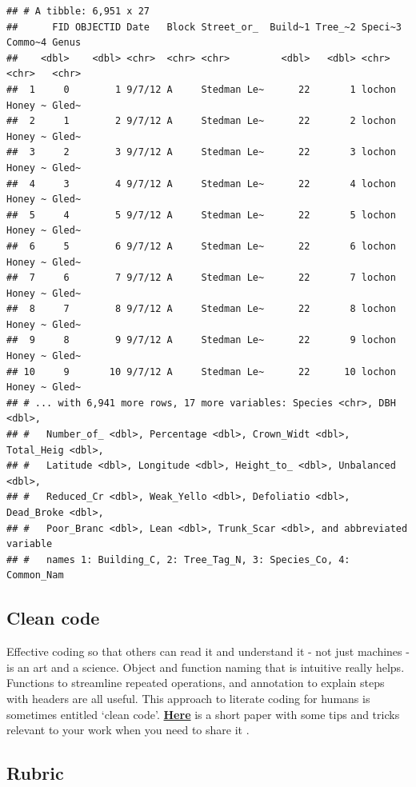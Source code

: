 \documentclass[
]{book}
\begin{document}
\begin{verbatim}
## # A tibble: 6,951 x 27
##      FID OBJECTID Date   Block Street_or_  Build~1 Tree_~2 Speci~3 Commo~4 Genus
##    <dbl>    <dbl> <chr>  <chr> <chr>         <dbl>   <dbl> <chr>   <chr>   <chr>
##  1     0        1 9/7/12 A     Stedman Le~      22       1 lochon  Honey ~ Gled~
##  2     1        2 9/7/12 A     Stedman Le~      22       2 lochon  Honey ~ Gled~
##  3     2        3 9/7/12 A     Stedman Le~      22       3 lochon  Honey ~ Gled~
##  4     3        4 9/7/12 A     Stedman Le~      22       4 lochon  Honey ~ Gled~
##  5     4        5 9/7/12 A     Stedman Le~      22       5 lochon  Honey ~ Gled~
##  6     5        6 9/7/12 A     Stedman Le~      22       6 lochon  Honey ~ Gled~
##  7     6        7 9/7/12 A     Stedman Le~      22       7 lochon  Honey ~ Gled~
##  8     7        8 9/7/12 A     Stedman Le~      22       8 lochon  Honey ~ Gled~
##  9     8        9 9/7/12 A     Stedman Le~      22       9 lochon  Honey ~ Gled~
## 10     9       10 9/7/12 A     Stedman Le~      22      10 lochon  Honey ~ Gled~
## # ... with 6,941 more rows, 17 more variables: Species <chr>, DBH <dbl>,
## #   Number_of_ <dbl>, Percentage <dbl>, Crown_Widt <dbl>, Total_Heig <dbl>,
## #   Latitude <dbl>, Longitude <dbl>, Height_to_ <dbl>, Unbalanced <dbl>,
## #   Reduced_Cr <dbl>, Weak_Yello <dbl>, Defoliatio <dbl>, Dead_Broke <dbl>,
## #   Poor_Branc <dbl>, Lean <dbl>, Trunk_Scar <dbl>, and abbreviated variable
## #   names 1: Building_C, 2: Tree_Tag_N, 3: Species_Co, 4: Common_Nam
\end{verbatim}

\hypertarget{clean-code}{%
\subsection*{Clean code}\label{clean-code}}

Effective coding so that others can read it and understand it - not just machines - is an art and a science. Object and function naming that is intuitive really helps. Functions to streamline repeated operations, and annotation to explain steps with headers are all useful. This approach to literate coding for humans is sometimes entitled `clean code'. \href{https://besjournals.onlinelibrary.wiley.com/doi/10.1111/2041-210X.13961}{\textbf{Here}} is a short paper with some tips and tricks relevant to your work when you need to share it \citep{RNclean}.

\hypertarget{rubric-1}{%
\subsection*{Rubric}\label{rubric-1}}
\end{document}
